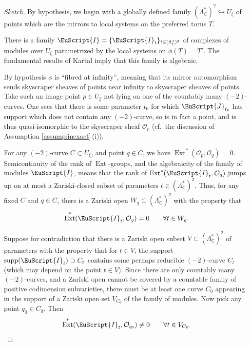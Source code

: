 \documentclass[pdftex]{sigma}
\DeclareMathOperator{\Ext}{Ext}
\def\scrJ{\EuScript{J}}
\def\bC{\mathbb{C}}
\theoremstyle{definition}
\newcommand{\EuI}{\EuScript{I}}
\numberwithin{equation}{section}
\begin{document}
\begin{proof}[Sketch]
By hypothesis, we begin with a globally defined family $(\Lambda_{\bC}^*)^2 \hookrightarrow U_{\xi}$ of points which are the mirrors to local systems on the preferred torus $T$.

There is a family $\EuI = \{\EuI_t\}_{t \in (\Lambda_\bC^*)^2}$ of complexes of modules over $U_{\xi}$ parametrized by the local systems on $\phi(T) = T'$. The fundamental results of Kartal \cite{Kartal:algebraic} imply that this family is algebraic.

By hypothesis $\phi$ is ``fibred at infinity'', meaning that its mirror automorphism sends skyscrap\-er sheaves of points near infinity to skyscraper sheaves of points. Take such an image point $p \in U_{\xi}$ not lying on one of the countably many $(-2)$-curves. One sees that there is some parameter $t_0$ for which $\scrJ_{t_0}$ has support which does not contain any $(-2)$-curve, so is in fact a point, and is thus quasi-isomorphic to the skyscraper sheaf $\mathcal{O}_p$
(cf.~the discussion of Assumption \ref{assump:inexact}\,(i)).

For any $(-2)$-curve $C \subset U_{\xi}$, and point $q \in C$, we have $\Ext^*(\mathcal{O}_p,\mathcal{O}_q)$ = 0. Semicontinuity of the rank of $\Ext$-groups, and the algebraicity of the family of modules $\EuI$, means that the rank of $\Ext^*(\EuI_t,\mathcal{O}_q)$ jumps up on at most a Zariski-closed subset of parameters $t \in (\Lambda_{\bC}^*)^2$. Thus, for any fixed $C$ and $q\in C$, there is a Zariski open $W_q \subset (\Lambda_{\bC}^*)^2$ with the property that
\begin{equation}\label{eqn:first Ext}
\Ext^*(\EuI_t,\mathcal{O}_q) = 0 \qquad \forall t \in W_q.
\end{equation}

Suppose for contradiction that there is a Zariski open subset $V \subset (\Lambda_{\bC}^*)^2$ of parameters with the property that for $t\in V$, the support $\mathrm{supp}(\EuI_t) \supset C_t$ contains some perhaps reducible $(-2)$-curve $C_t$ (which may depend on the point $t\in V$). Since there are only countably many $(-2)$-curves, and a Zariski open cannot be covered by a countable family of positive codimension subvarieties, there must be at least one curve $C_0$ appearing in the support of a Zariski open set $V_{C_0}$ of the family of modules. Now pick any point $q_0\in C_0$. Then
\begin{equation} \label{eqn:second Ext}
\Ext^*(\EuI_t,\mathcal{O}_{q_0}) \neq 0 \qquad \forall t \in V_{C_0}.
\end{equation}


\end{proof}
\end{document}
